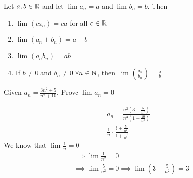 \begin{theorem}
	Let $a, b \in \mathbb{R}$ and let $\lim_{} a_n = a$ and $\lim_{} b_n = b$. Then
	\begin{enumerate}
		\item $\lim_{} \left( c a_n \right)  = ca$ for all $c \in \mathbb{R}$
		\item $\lim_{} \left( a_n +b _n \right)  = a + b$ 
		\item $\lim_{} \left( a_n b_n \right)  = ab$ 
		\item If  $b \neq 0$ and $b_n \neq 0$ $\forall n \in \mathbb{N}$, then $\lim_{} \left( \frac{a_n}{b_n} \right)  = \frac{a}{b}$
	\end{enumerate}
\end{theorem}

\begin{eg}
	Given $a_n = \frac{3n^{2} + 5}{n^{2} + 10}$. Prove $\lim_{} a_n = 0$
\end{eg}

\begin{eg}
	\begin{align}
		a_n = \frac{n^{2} \left( 3 + \frac{5}{n^{2}} \right) }{n^{3} \left( 1 + \frac{10}{n^{3}} \right) } \\
		\frac{1}{n} \cdot \frac{3 + \frac{5}{n^{2}}}{1 + \frac{10}{n^{3}}}
	\end{align}
	We know that $\lim_{} \frac{1}{n} = 0$ 
	\begin{align}
		&\implies \lim_{} \frac{1}{n^{2}} = 0 \\
		&\implies \lim_{} \frac{5}{n^{2}} = 0 \implies \lim_{} \left( 3 + \frac{5}{n^{2}} \right) = 3
	\end{align}
\end{eg}


